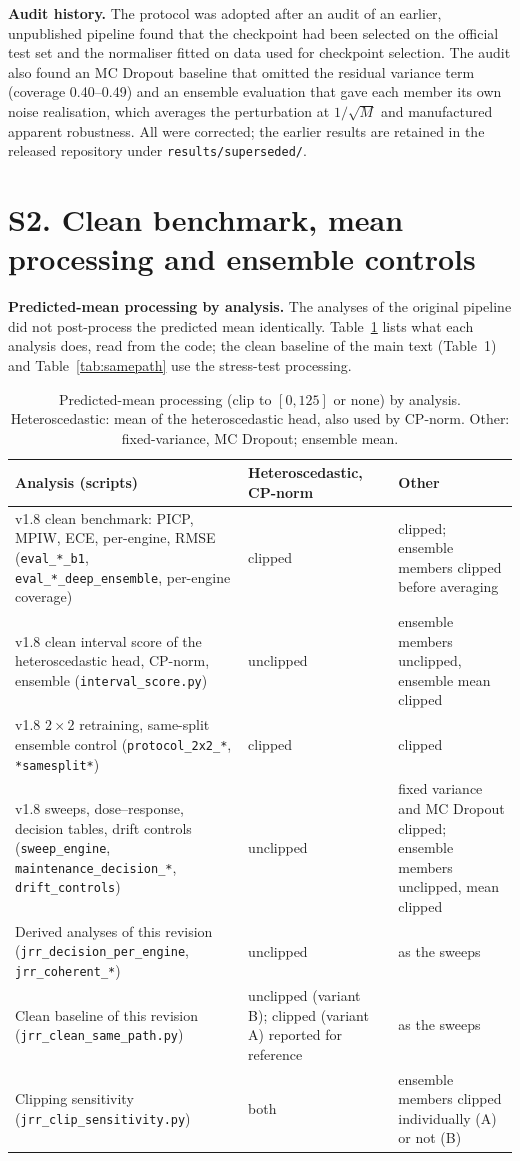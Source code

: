 \noindent\textbf{Audit history.} The protocol was adopted after an audit of an earlier, unpublished pipeline found that the checkpoint had been selected on the official test set and the normaliser fitted on data used for checkpoint selection. The audit also found an MC Dropout baseline that omitted the residual variance term (coverage 0.40--0.49) and an ensemble evaluation that gave each member its own noise realisation, which averages the perturbation at $1/\sqrt{M}$ and manufactured apparent robustness. All were corrected; the earlier results are retained in the released repository under \texttt{results/superseded/}.

\section*{S2. Clean benchmark, mean processing and ensemble controls}
\noindent\textbf{Predicted-mean processing by analysis.} The analyses of the original pipeline did not post-process the predicted mean identically. Table~\ref{tab:proto} lists what each analysis does, read from the code; the clean baseline of the main text (Table~1) and Table~\ref{tab:samepath} use the stress-test processing.
\begin{table}[H]\centering\scriptsize
\caption{Predicted-mean processing (clip to $[0,125]$ or none) by analysis. Heteroscedastic: mean of the heteroscedastic head, also used by CP-norm. Other: fixed-variance, MC Dropout; ensemble mean.}\label{tab:proto}
\begin{tabular}{p{5.6cm}p{3.6cm}p{4.4cm}}\toprule Analysis (scripts) & Heteroscedastic, CP-norm & Other \\ \midrule
v1.8 clean benchmark: PICP, MPIW, ECE, per-engine, RMSE (\texttt{eval\_*\_b1}, \texttt{eval\_*\_deep\_ensemble}, per-engine coverage) & clipped & clipped; ensemble members clipped before averaging \\
v1.8 clean interval score of the heteroscedastic head, CP-norm, ensemble (\texttt{interval\_score.py}) & unclipped & ensemble members unclipped, ensemble mean clipped \\
v1.8 $2\times2$ retraining, same-split ensemble control (\texttt{protocol\_2x2\_*}, \texttt{*samesplit*}) & clipped & clipped \\
v1.8 sweeps, dose--response, decision tables, drift controls (\texttt{sweep\_engine}, \texttt{maintenance\_decision\_*}, \texttt{drift\_controls}) & unclipped & fixed variance and MC Dropout clipped; ensemble members unclipped, mean clipped \\
Derived analyses of this revision (\texttt{jrr\_decision\_per\_engine}, \texttt{jrr\_coherent\_*}) & unclipped & as the sweeps \\
Clean baseline of this revision (\texttt{jrr\_clean\_same\_path.py}) & unclipped (variant B); clipped (variant A) reported for reference & as the sweeps \\
Clipping sensitivity (\texttt{jrr\_clip\_sensitivity.py}) & both & ensemble members clipped individually (A) or not (B) \\ \bottomrule
\end{tabular}
\end{table}
